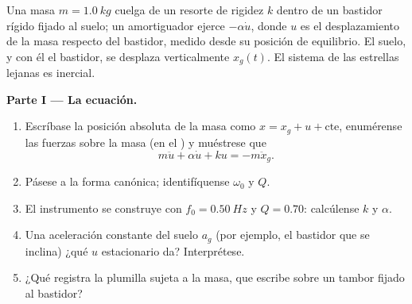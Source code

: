 \begin{problem}
\label{pb:b1:oscillators-resonance:1}
Una masa $m = \qty{1.0}{kg}$ cuelga de un resorte de rigidez $k$ dentro de
un bastidor rígido fijado al suelo; un amortiguador ejerce $-\alpha\dot u$,
donde $u$ es el desplazamiento de la masa respecto del bastidor, medido
desde su posición de equilibrio. El suelo, y con él el bastidor, se
desplaza verticalmente $x_g(t)$. El sistema de las estrellas lejanas es inercial.

\medskip
\noindent\textbf{Parte I --- La ecuación.}
\begin{enumerate}
  \item Escríbase la posición absoluta de la masa como $x = x_g + u +
        \text{cte}$, enumérense las fuerzas sobre la masa (en el ) y muéstrese que
        \[
        m\ddot u + \alpha\dot u + ku = -m\ddot x_g .
        \]
  \item Pásese a la forma canónica; identifíquense $\omega_0$ y $Q$.
  \item El instrumento se construye con $f_0 = \qty{0.50}{Hz}$ y $Q = 0.70$:
        calcúlense $k$ y $\alpha$.
  \item Una aceleración constante del suelo $a_g$ (por ejemplo, el
        bastidor que se inclina) ¿qué $u$ estacionario da? Interprétese.
  \item ¿Qué registra la plumilla sujeta a la masa, que escribe sobre un
        tambor fijado al bastidor?
\end{enumerate}


\end{problem}
